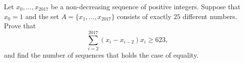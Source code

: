 Let $x_0,\dots,x_{2017}$ be a non-decreasing sequence of positive integers. Suppose that $x_0 = 1$ and the set $A=\{x_1,\dots,x_{2017}\}$ consists of exactly $25$ different numbers. Prove that \[\sum_{i=2}^{2017}(x_i-x_{i-2})x_i\geq 623\text{,}\] and find the number of sequences that holds the case of equality.
